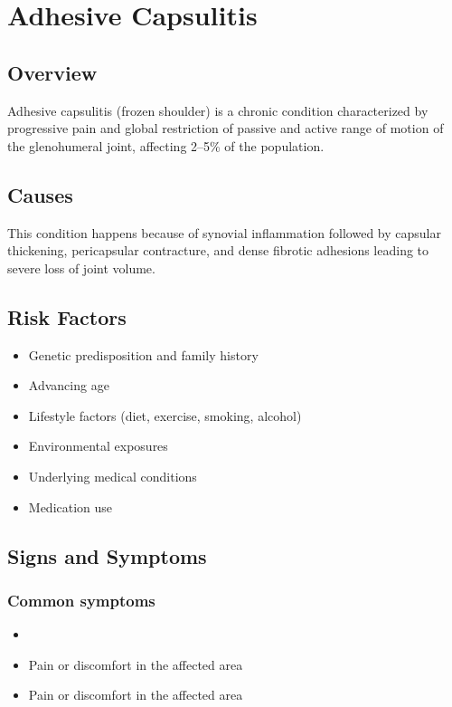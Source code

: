 \chapter{Adhesive Capsulitis}
\label{sec:Adhesive Capsulitis}

\section{Overview}
Adhesive capsulitis (frozen shoulder) is a chronic condition characterized by progressive pain and global restriction of passive and active range of motion of the glenohumeral joint, affecting 2--5\% of the population.
\section{Causes}
This condition happens because of synovial inflammation followed by capsular thickening, pericapsular contracture, and dense fibrotic adhesions leading to severe loss of joint volume.     
\section{Risk Factors}

\begin{itemize}[noitemsep]
  \item Genetic predisposition and family history
  \item Advancing age
  \item Lifestyle factors (diet, exercise, smoking, alcohol)
  \item Environmental exposures
  \item Underlying medical conditions
  \item Medication use
\end{itemize}
\section{Signs and Symptoms}

\subsection{Common symptoms}
\begin{itemize}[noitemsep]
  \item \item Pain or discomfort in the affected area    \item Pain or discomfort in the affected area
  \end{itemize}


